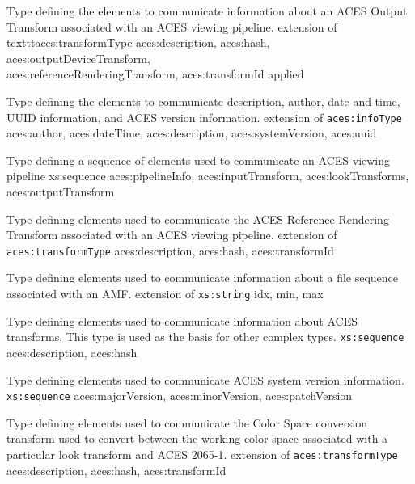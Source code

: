                 {Type defining the elements to communicate information about an ACES Output Transform associated with an ACES viewing pipeline.}
                {extension of texttt{aces:transformType}}
                {aces:description, aces:hash, aces:outputDeviceTransform,\\ aces:referenceRenderingTransform, aces:transformId}
                {applied}

            {Type defining the elements to communicate description, author, date and time, UUID information, and ACES version information.}
            {extension of \texttt{aces:infoType}}
            {aces:author, aces:dateTime, aces:description, aces:systemVersion, aces:uuid}
            
            {Type defining a sequence of elements used to communicate an ACES viewing pipeline}
            {xs:sequence}
            {aces:pipelineInfo, aces:inputTransform, aces:lookTransforms,\\ aces:outputTransform}
 
            {Type defining elements used to communicate the ACES Reference Rendering Transform associated with an ACES viewing pipeline.}
            {extension of \texttt{aces:transformType}}
            {aces:description, aces:hash, aces:transformId}

                {Type defining elements used to communicate information about a file sequence associated with an AMF.}
                {extension of \texttt{xs:string}}
                {idx, min, max}

            {Type defining elements used to communicate information about ACES transforms.  This type is used as the basis for other complex types.}
            {\texttt{xs:sequence}}
            {aces:description, aces:hash}

            {Type defining elements used to communicate ACES system version information.}
            {\texttt{xs:sequence}}
            {aces:majorVersion, aces:minorVersion, aces:patchVersion}

            {Type defining elements used to communicate the Color Space conversion transform used to convert between the working color space associated with a particular look transform and ACES 2065-1.}
            {extension of \texttt{aces:transformType}}
            {aces:description, aces:hash, aces:transformId}
